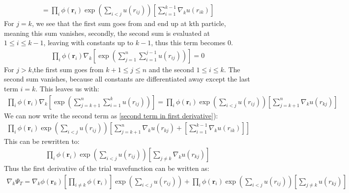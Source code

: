 \documentclass[a4paper, 10pt]{article}
\begin{document}
\begin{appendices}
\begin{align}
		=
		\prod_{i}\phi(\boldsymbol{r}_{i})\exp{\left(\sum_{i<j}u(r_{ij})\right)}
		\left[\sum_{i = 1}^{k-1}\nabla_{k}u(r_{ik})\right]
		\end{align}
		For $j = k$, we see that the first sum goes from and end up at kth particle, meaning
		this sum vanishes, secondly, the second sum is evaluated at $1 \le i \le k-1$, leaving with
		constants up to $k-1$, thus this term becomes $0$.
		\begin{align}
		\prod_{i}\phi(\boldsymbol{r}_{i})\nabla_{k}\left[\exp\left(\sum_{j = 1}^{n}\sum_{i = 1}^{j-1}u(r_{ij})\right)\right]
		= 0
		\end{align}
		For $j > k$,the first sum goes from $k+1\le j \le n$ and the second $1 \le i \le k$.  The second sum vanishes, because all constants are differentiated away
		except the last term $i = k$. This leaves us with:
		\begin{align}
		\prod_{i}\phi(\boldsymbol{r}_{i})\nabla_{k}\left[\exp\left(\sum_{j = k+1}^{n}\sum_{i = 1}^{k}u(r_{ij})\right)\right]
		= \prod_{i}\phi(\boldsymbol{r}_{i})
		\exp{\left(\sum_{i<j}u(r_{ij})\right)}
		\left[\sum_{j = k + 1}^{n}\nabla_{k}u(r_{kj})\right]
		\end{align}
		We can now write the second term as \ref{second term in first derivative}):
		\begin{align}\label{combined sum}
		\prod_{i}\phi(\boldsymbol{r}_{i})
		\exp{\left(\sum_{i<j}u(r_{ij})\right)}
		\left[\sum_{j = k + 1}^{n}\nabla_{k}u(r_{kj}) +
		\left[\sum_{i = 1}^{k-1}\nabla_{k}u(r_{ik})\right]\right]
		\end{align}
		This can be rewritten to:
		\begin{align}
		\prod_{i}\phi(\boldsymbol{r}_{i})
		\exp{\left(\sum_{i<j}u(r_{ij})\right)}
		\left[\sum_{j \neq k}\nabla_{k}u(r_{kj})\right]
		\end{align}
		Thus the first derivative of the trial wavefunction
		can be written as:
		\begin{align}
		\nabla_{k}\Psi_{T} =
		\nabla_k \phi(\mathbf{r}_k)\left[ \prod_{i\neq k} \phi(\mathbf{r}_i)\right]\exp\left(\sum_{i<j}u(r_{ij})\right)
		+ \prod_{i}\phi(\boldsymbol{r}_{i})
		\exp{\left(\sum_{i<j}u(r_{ij})\right)}
		\left[\sum_{j \neq k}u(r_{kj})\right]
		\end{align}

\end{appendices}
\end{document}
